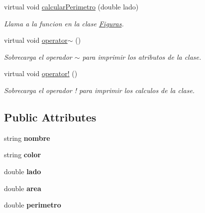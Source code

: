 \begin{DoxyCompactItemize}
\hypertarget{class_cuadrado_a2deca0b349c2f70d771282c75e737c0c}{}\label{class_cuadrado_a2deca0b349c2f70d771282c75e737c0c} 
virtual void \hyperlink{class_cuadrado_a2deca0b349c2f70d771282c75e737c0c}{calcular\+Perimetro} (double lado)
\begin{DoxyCompactList}\small\item\em Llama a la funcion en la clase \hyperlink{class_figuras}{Figuras}. \end{DoxyCompactList}\item 
\hypertarget{class_cuadrado_a6303f81de8d357f415d00a116b73a6fc}{}\label{class_cuadrado_a6303f81de8d357f415d00a116b73a6fc} 
virtual void \hyperlink{class_cuadrado_a6303f81de8d357f415d00a116b73a6fc}{operator$\sim$} ()
\begin{DoxyCompactList}\small\item\em Sobrecarga el operador $\sim$ para imprimir los atributos de la clase. \end{DoxyCompactList}\item 
\hypertarget{class_cuadrado_a78be5dcef640ad7f82858f44fb623af5}{}\label{class_cuadrado_a78be5dcef640ad7f82858f44fb623af5} 
virtual void \hyperlink{class_cuadrado_a78be5dcef640ad7f82858f44fb623af5}{operator!} ()
\begin{DoxyCompactList}\small\item\em Sobrecarga el operador ! para imprimir los calculos de la clase. \end{DoxyCompactList}\end{DoxyCompactItemize}
\subsection*{Public Attributes}
\begin{DoxyCompactItemize}
\item 
\hypertarget{class_cuadrado_a2d85cc9025c27709524fff4f8ee89645}{}\label{class_cuadrado_a2d85cc9025c27709524fff4f8ee89645} 
string {\bfseries nombre}
\item 
\hypertarget{class_cuadrado_ae8ad3499e4f99746dde86b42b3e50c2d}{}\label{class_cuadrado_ae8ad3499e4f99746dde86b42b3e50c2d} 
string {\bfseries color}
\item 
\hypertarget{class_cuadrado_a0480679f3e1c059282f532167c81d439}{}\label{class_cuadrado_a0480679f3e1c059282f532167c81d439} 
double {\bfseries lado}
\item 
\hypertarget{class_cuadrado_a5912fed1157e6e738bca7477013a3699}{}\label{class_cuadrado_a5912fed1157e6e738bca7477013a3699} 
double {\bfseries area}
\item 
\hypertarget{class_cuadrado_aabf689b756dda0bd3f3b09e021080113}{}\label{class_cuadrado_aabf689b756dda0bd3f3b09e021080113} 
double {\bfseries perimetro}
\end{DoxyCompactItemize}


